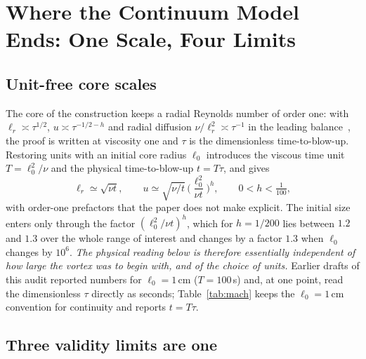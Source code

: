 \documentclass[11pt,a4paper]{article}
\begin{document}
\section{Where the Continuum Model Ends: One Scale, Four Limits}
\label{sec:mach}

\subsection{Unit-free core scales}

The core of the construction keeps a radial Reynolds number of order one: with
$\ell_r\asymp\tau^{1/2}$, $u\asymp\tau^{-1/2-h}$ and radial diffusion $\nu/\ell_r^2\asymp\tau^{-1}$
in the leading balance~\cite[\S2.1]{OpenAI2026}, the proof is written at viscosity one and $\tau$ is
the dimensionless time-to-blow-up. Restoring units with an initial core radius $\ell_0$ introduces
the viscous time unit $T=\ell_0^2/\nu$ and the physical time-to-blow-up $t=T\tau$, and gives
\begin{equation}
  \ell_r \simeq \sqrt{\nu t},\qquad
  u \simeq \sqrt{\nu/t}\,\Big(\frac{\ell_0^2}{\nu t}\Big)^{h},\qquad 0<h<\tfrac1{100},
  \label{eq:diffusive}
\end{equation}
with order-one prefactors that the paper does not make explicit. The initial size enters only through
the factor $(\ell_0^2/\nu t)^h$, which for $h=1/200$ lies between $1.2$ and $1.3$ over the whole range
of interest and changes by a factor $1.3$ when $\ell_0$ changes by $10^6$. \emph{The physical reading
below is therefore essentially independent of how large the vortex was to begin with, and of the
choice of units.} Earlier drafts of this audit reported numbers for $\ell_0=1$\,cm ($T=100$\,s) and,
at one point, read the dimensionless $\tau$ directly as seconds; Table~\ref{tab:mach} keeps the
$\ell_0=1$\,cm convention for continuity and reports $t=T\tau$.

\subsection{Three validity limits are one}
\end{document}
